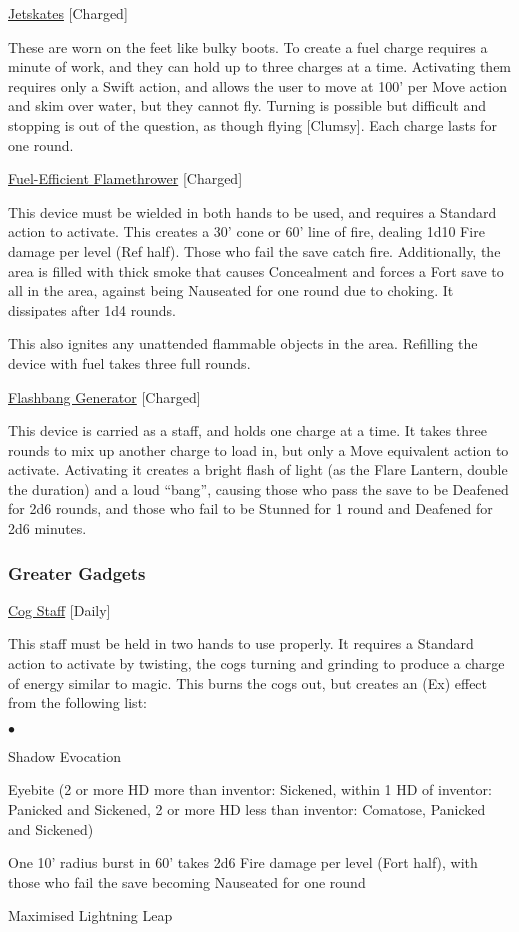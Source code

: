 \medskip\noindent\underline{Jetskates} [Charged]
 
\noindent These are worn on the feet like bulky boots. To create a fuel charge requires a minute of work, and they can hold up to three charges at a time. Activating them requires only a Swift action, and allows the user to move at 100' per Move action and skim over water, but they cannot fly. Turning is possible but difficult and stopping is out of the question, as though flying [Clumsy]. Each charge lasts for one round. 

\medskip\noindent\underline{Fuel-Efficient Flamethrower} [Charged]
 
\noindent This device must be wielded in both hands to be used, and requires a Standard action to activate. This creates a 30' cone or 60' line of fire, dealing 1d10 Fire damage per level (Ref half). Those who fail the save catch fire. Additionally, the area is filled with thick smoke that causes Concealment and forces a Fort save to all in the area, against being Nauseated for one round due to choking. It dissipates after 1d4 rounds. 

\smallskip\noindent This also ignites any unattended flammable objects in the area. Refilling the device with fuel takes three full rounds. 

\medskip\noindent\underline{Flashbang Generator} [Charged] 

\noindent This device is carried as a staff, and holds one charge at a time. It takes three rounds to mix up another charge to load in, but only a Move equivalent action to activate. Activating it creates a bright flash of light (as the Flare Lantern, double the duration) and a loud ``bang'', causing those who pass the save to be Deafened for 2d6 rounds, and those who fail to be Stunned for 1 round and Deafened for 2d6 minutes. 

\subsubsection{Greater Gadgets}

\noindent\underline{Cog Staff} [Daily]
 
\noindent This staff must be held in two hands to use properly. It requires a Standard action to activate by twisting, the cogs turning and grinding to produce a charge of energy similar to magic. This burns the cogs out, but creates an (Ex) effect from the following list:

\begin{list}{$\bullet$}{\itemspace}
\item Shadow Evocation 
\item Eyebite (2 or more HD more than inventor: Sickened, within 1 HD of inventor: Panicked and Sickened, 2 or more HD less than inventor: Comatose, Panicked and Sickened) 
\item One 10' radius burst in 60' takes 2d6 Fire damage per level (Fort half), with those who fail the save becoming Nauseated for one round 
\item Maximised Lightning Leap
\end{list}

